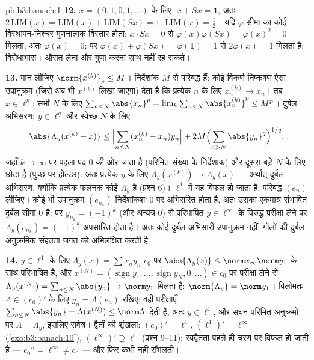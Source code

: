 \begin{solution}{pb:b3:banach:1}
\textbf{12.} $x = (0,1,0,1,\dots)$ के लिए: $x + Sx = \mathbf 1$, अतः $2\,\mathrm{LIM}(x) = \mathrm{LIM}(x) + \mathrm{LIM}(Sx) =
1$: $\mathrm{LIM}(x) = \frac12$। यदि $\varphi$ सीमा
का कोई विस्थापन-निश्चर गुणनात्मक विस्तार होता: $x\cdot
Sx = 0$ से $\varphi(x)\varphi(Sx) = \varphi(x)^2 = 0$ मिलता,
अतः $\varphi(x) = 0$; पर $\varphi(x) + \varphi(Sx) =
\varphi(\mathbf 1) = 1$ से $2\varphi(x) = 1$ मिलता है: विरोधाभास। औसत लेना और गुणा
करना साथ नहीं रह सकते।

\textbf{13.} मान लीजिए $\norm{x^{(k)}}_p \leq M$। निर्देशांक $M$ से परिबद्ध हैं: कोई
विकर्ण निष्कर्षण ऐसा उपानुक्रम (जिसे अब भी $x^{(k)}$ लिखा जाएगा) देता
है कि प्रत्येक $n$ के लिए $x^{(k)}_n \to x_n$। तब $x \in \ell^p$: सभी $N$ के लिए $\sum_{n\leq N}\abs{x_n}^p =
\lim_k\sum_{n\leq N}\abs{x^{(k)}_n}^p \leq M^p$।
दुर्बल अभिसरण: $y \in \ell^q$ और स्वेच्छ $N$ के लिए
\[
\abs{\Lambda_y(x^{(k)} - x)} \leq
\Bigl|\sum_{n \leq N}(x^{(k)}_n - x_n)y_n\Bigr|
+ 2M\Bigl(\sum_{n>N}\abs{y_n}^q\Bigr)^{1/q},
\]
जहाँ $k \to \infty$ पर पहला पद $0$ की ओर जाता है (परिमित संख्या के निर्देशांक)
और दूसरा बड़े $N$ के लिए छोटा है (पुच्छ पर होल्डर): अतः प्रत्येक
$y$ के लिए $\Lambda_y(x^{(k)}) \to \Lambda_y(x)$ --- अर्थात् दुर्बल अभिसरण, क्योंकि प्रत्येक फलनक
कोई $\Lambda_y$ है (प्रश्न 6)। $\ell^1$ में यह विफल हो जाता है: परिबद्ध $(e_n)$
लीजिए। कोई भी उपानुक्रम $(e_{n_k})$ निर्देशांकशः $0$ पर अभिसरित होता
है, अतः उसका एकमात्र संभावित दुर्बल सीमा $0$ है; पर $y_{n_k} =
(-1)^k$ (और
अन्यत्र $0$) से परिभाषित $y \in \ell^\infty$ के विरुद्ध परीक्षा लेने पर $\Lambda_y(e_{n_k}) = (-1)^k$
अपसारित होता है। अतः कोई दुर्बल अभिसारी उपानुक्रम नहीं: गोलों की
दुर्बल अनुक्रमिक संहतता  जगत को अभिलक्षित करती है।

\textbf{14.} $y \in \ell^1$ के लिए $\Lambda_y(x) = \sum x_ny_n$ $c_0$ पर $\abs{\Lambda_y(x)} \leq \norm
x_\infty\norm y_1$ के साथ परिभाषित है,
और $x^{(N)} =
(\operatorname{sign}y_1, \dots, \operatorname{sign}y_N, 0,
\dots) \in c_0$ पर परीक्षा लेने से $\Lambda_y(x^{(N)}) =
\sum_{n\leq N}\abs{y_n} \to \norm y_1$ मिलता है: $\norm{\Lambda_y} = \norm y_1$। विलोमतः $\Lambda \in
(c_0)'$ के
लिए $y_n = \Lambda(e_n)$ रखिए; वही परीक्षाएँ $\sum_{n \leq N}\abs{y_n} = \Lambda(x^{(N)}) \leq
\norm\Lambda$ देती हैं, अतः $y \in \ell^1$, और सघन
परिमित अनुक्रमों पर $\Lambda = \Lambda_y$, इसलिए सर्वत्र। द्वैतों की शृंखला: $(c_0)' = \ell^1$,
$(\ell^1)' = \ell^\infty$ (\cref{exo:b3:banach:10}), $(\ell^\infty)' \supsetneq \ell^1$ (प्रश्न 9--11): स्वद्वैतता पहले ही चरण पर विफल
हो जाती है --- $c_0'' = \ell^\infty \neq c_0$ --- और फिर कभी नहीं सँभलती।


\end{solution}
